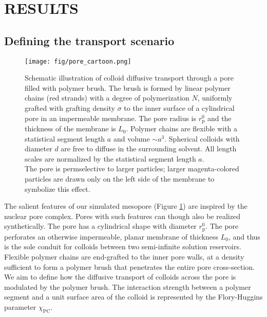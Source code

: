 \documentclass[12pt, a4paper]{article}
\begin{document}
\section{RESULTS}


\subsection{Defining the transport scenario}

\begin{figure}
    \centering
    \texttt{[image: fig/pore\_cartoon.png]}
    \caption{
        Schematic illustration of colloid diffusive transport through a pore filled with polymer brush. 
        The brush is formed by linear polymer chains (red strands) with a degree of polymerization $N$, uniformly grafted with grafting density $\sigma$ 
        to the inner surface of a cylindrical pore in an impermeable membrane. The pore radius is $r_{\text{p}}^{0}$ and the thickness of the membrane is $L_{0}$.
        Polymer chains are flexible with a statistical segment length $a$ and volume $\sim a^3$. 
        Spherical colloids with diameter $d$ are free to diffuse in the surrounding solvent.
        All length scales are normalized by the statistical segment length $a$.
        \\
        The pore is permselective to larger particles; larger magenta-colored particles are drawn only on the left side of the membrane to symbolize this effect.
        }
    \label{fig:colloid_transport}
\end{figure}

The salient features of our simulated mesopore (Figure \ref{fig:colloid_transport}) are inspired by the nuclear pore complex.
Pores with such features can though also be realized synthetically.
The pore has a cylindrical shape with diameter $r_{\text{p}}^{0}$.
The pore perforates an otherwise impermeable, planar membrane of thickness $L_{0}$, and thus is the sole conduit for colloids between two semi-infinite solution reservoirs.
Flexible polymer chains are end-grafted to the inner pore walls, at a density sufficient to form a polymer brush that penetrates the entire pore cross-section.
We aim to define how the diffusive transport of colloids across the pore is modulated by the polymer brush. 
The interaction strength between a polymer segment and a unit surface area of the colloid is represented by the Flory-Huggins parameter $\chi_{\text{PC}}$. 
\end{document}
